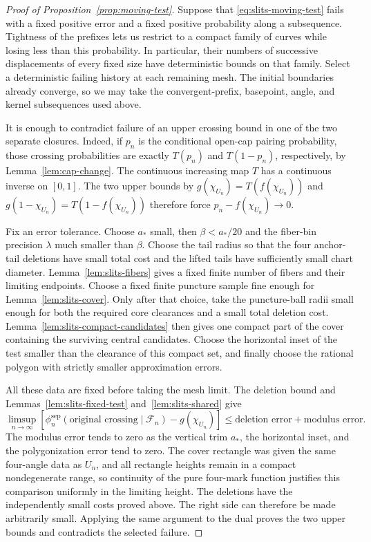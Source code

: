 \begin{proof}[Proof of Proposition~\ref{prop:moving-test}]
Suppose that \eqref{eq:slits-moving-test} fails with a fixed positive
error and a fixed positive probability along a subsequence.
Tightness of the prefixes lets us restrict to a compact family of
curves while losing less than this probability.  In particular,
their numbers of successive displacements of every fixed size
have deterministic bounds on that family.  Select a deterministic
failing history at each remaining mesh.  The initial boundaries
already converge, so we may take the convergent-prefix, basepoint,
angle, and kernel subsequences used above.

It is enough to contradict failure of an upper crossing bound in
one of the two separate closures.  Indeed, if $p_n$ is the
conditional open-cap pairing probability, those crossing
probabilities are exactly $T(p_n)$ and $T(1-p_n)$, respectively,
by Lemma~\ref{lem:cap-change}.  The continuous increasing
map $T$ has a continuous inverse on $[0,1]$.  The two upper bounds
by $g(\chi_{U_n})=T(f(\chi_{U_n}))$ and
$g(1-\chi_{U_n})=T(1-f(\chi_{U_n}))$ therefore force
$p_n-f(\chi_{U_n})\to0$.

Fix an error tolerance.  Choose $a_*$ small, then $\beta<a_*/20$
and the fiber-bin precision $\lambda$ much smaller than $\beta$.
Choose the tail radius so that the four anchor-tail deletions have
small total cost and the lifted tails have sufficiently small chart
diameter.  Lemma~\ref{lem:slits-fibers} gives a fixed finite number
of fibers and their limiting endpoints.  Choose a fixed finite
puncture sample fine enough for Lemma~\ref{lem:slits-cover}.  Only
after that choice, take the puncture-ball radii small enough for
both the required core clearances and a small total deletion cost.
Lemma~\ref{lem:slits-compact-candidates} then gives one compact
part of the cover containing the surviving central candidates.
Choose the horizontal inset of the test smaller than the clearance
of this compact set, and finally choose the rational polygon with
strictly smaller approximation errors.

All these data are fixed before taking the mesh limit.  The
deletion bound and Lemmas~\ref{lem:slits-fixed-test}
and~\ref{lem:slits-shared} give
\[
 \limsup_{n\to\infty}
 \left[
 \phi_n^{\mathrm{sep}}(\text{original crossing}\mid\mathcal F_n)
       -g(\chi_{U_n})
 \right]
 \leq \text{deletion error}+\text{modulus error}.
\]
The modulus error tends to zero as the vertical trim $a_*$, the
horizontal inset, and the polygonization error tend to zero.
The cover rectangle was given the same four-angle data as $U_n$,
and all rectangle heights remain in a compact nondegenerate range,
so continuity of the pure four-mark function justifies this
comparison uniformly in the limiting height.  The deletions have
the independently small costs proved above.  The right side can
therefore be made arbitrarily small.  Applying the same argument
to the dual proves the two upper bounds and contradicts the
selected failure.


\end{proof}
